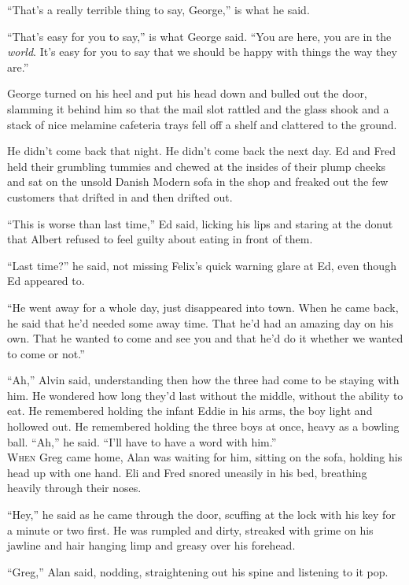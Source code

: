 ``That's a really terrible thing to say, George,'' is what he said.

``That's easy for you to say,'' is what George said.  ``You are here,
you are in the \textit{world}.  It's easy for you to say that we
should be happy with things the way they are.''

George turned on his heel and put his head down and bulled out the
door, slamming it behind him so that the mail slot rattled and the
glass shook and a stack of nice melamine cafeteria trays fell off a
shelf and clattered to the ground.

He didn't come back that night.  He didn't come back the next day.  Ed
and Fred held their grumbling tummies and chewed at the insides of
their plump cheeks and sat on the unsold Danish Modern sofa in the
shop and freaked out the few customers that drifted in and then
drifted out.

``This is worse than last time,'' Ed said, licking his lips and
staring at the donut that Albert refused to feel guilty about eating
in front of them.

``Last time?'' he said, not missing Felix's quick warning glare at Ed,
even though Ed appeared to.

``He went away for a whole day, just disappeared into town.  When he
came back, he said that he'd needed some away time.  That he'd had an
amazing day on his own.  That he wanted to come and see you and that
he'd do it whether we wanted to come or not.''

``Ah,'' Alvin said, understanding then how the three had come to be
staying with him.  He wondered how long they'd last without the
middle, without the ability to eat.  He remembered holding the infant
Eddie in his arms, the boy light and hollowed out.  He remembered
holding the three boys at once, heavy as a bowling ball.  ``Ah,'' he
said.  ``I'll have to have a word with him.''
\\
\lettrine[lines=3, lhang=.5, nindent=0pt, findent=2pt]{W}{hen} Greg came home, Alan was waiting for him, sitting on the sofa,
holding his head up with one hand.  Eli and Fred snored uneasily in
his bed, breathing heavily through their noses.

``Hey,'' he said as he came through the door, scuffing at the lock
with his key for a minute or two first.  He was rumpled and dirty,
streaked with grime on his jawline and hair hanging limp and greasy
over his forehead.

``Greg,'' Alan said, nodding, straightening out his spine and
listening to it pop.

